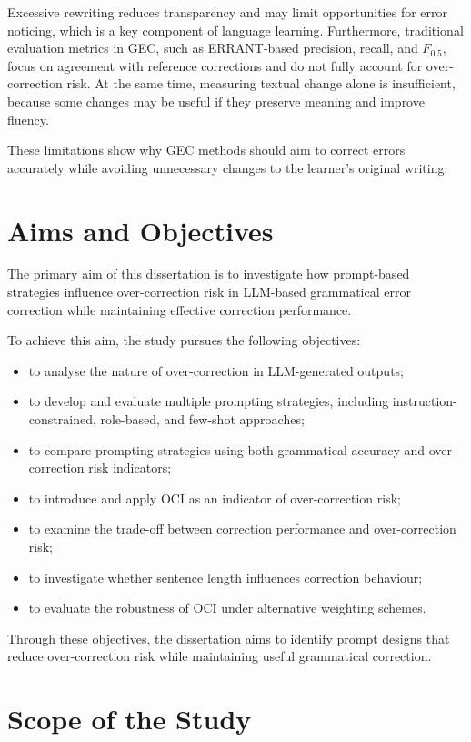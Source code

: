 Excessive rewriting reduces transparency and may limit opportunities for error noticing, which is a key component of language learning. Furthermore, traditional evaluation metrics in GEC, such as ERRANT-based precision, recall, and $F_{0.5}$, focus on agreement with reference corrections and do not fully account for over-correction risk. At the same time, measuring textual change alone is insufficient, because some changes may be useful if they preserve meaning and improve fluency.

These limitations show why GEC methods should aim to correct errors accurately while avoiding unnecessary changes to the learner's original writing.

\section{Aims and Objectives}

The primary aim of this dissertation is to investigate how prompt-based strategies influence over-correction risk in LLM-based grammatical error correction while maintaining effective correction performance.

To achieve this aim, the study pursues the following objectives:

\begin{itemize}
    \item to analyse the nature of over-correction in LLM-generated outputs;
    \item to develop and evaluate multiple prompting strategies, including instruction-constrained, role-based, and few-shot approaches;
    \item to compare prompting strategies using both grammatical accuracy and over-correction risk indicators;
    \item to introduce and apply OCI as an indicator of over-correction risk;
    \item to examine the trade-off between correction performance and over-correction risk;
    \item to investigate whether sentence length influences correction behaviour;
    \item to evaluate the robustness of OCI under alternative weighting schemes.
\end{itemize}

Through these objectives, the dissertation aims to identify prompt designs that reduce over-correction risk while maintaining useful grammatical correction.

\section{Scope of the Study}

